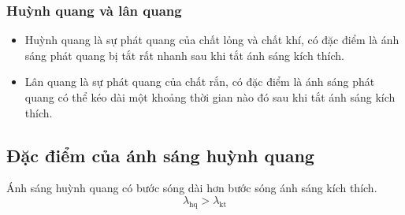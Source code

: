 \subsubsection{Huỳnh quang và lân quang}
\begin{itemize}
	\item Huỳnh quang là sự phát quang của chất lỏng và chất khí, có đặc điểm là ánh sáng phát quang bị tắt rất nhanh sau khi tắt ánh sáng kích thích.
	\item Lân quang là sự phát quang của chất rắn, có đặc điểm là ánh sáng phát quang có thể kéo dài một khoảng thời gian nào đó sau khi tắt ánh sáng kích thích.
\end{itemize}
\subsection{Đặc điểm của ánh sáng huỳnh quang}
Ánh sáng huỳnh quang có bước sóng dài hơn bước sóng ánh sáng kích thích.
\begin{equation}
	\lambda_\text{hq} > \lambda_\text{kt}
\end{equation}

